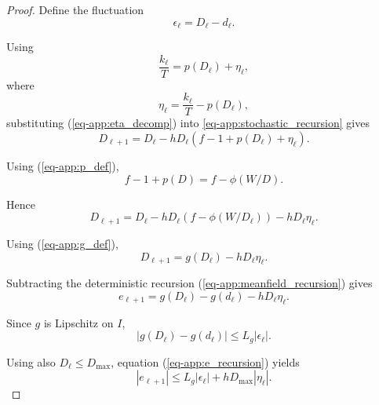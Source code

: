 \documentclass[10pt]{iopart}
\newcommand{\1}{\mathbf{1}}
\begin{document}
\begin{proof}

Define the fluctuation
\begin{equation}
\epsilon_\ell=D_\ell-d_\ell.
\label{eq-app:e_def}
\end{equation}

Using
\begin{equation}
\frac{k_\ell}{T}
=
p(D_\ell)+\eta_\ell,
\label{eq-app:eta_decomp}
\end{equation}
where
\begin{equation}
\eta_\ell
=
\frac{k_\ell}{T}-p(D_\ell),
\label{eq-app:eta_def}
\end{equation}
substituting (\ref{eq-app:eta_decomp}) into
\ref{eq-app:stochastic_recursion} gives
\begin{equation}
D_{\ell+1}
=
D_\ell
-
hD_\ell
\left(
f-1+p(D_\ell)+\eta_\ell
\right).
\label{eq-app:substituted}
\end{equation}

Using (\ref{eq-app:p_def}),
\begin{equation}
f-1+p(D)
=
f-\phi(W/D).
\label{eq-app:simplify_p}
\end{equation}

Hence
\begin{equation}
D_{\ell+1}
=
D_\ell
-
hD_\ell
\left(
f-\phi(W/D_\ell)
\right)
-
hD_\ell\eta_\ell.
\label{eq-app:stochastic_eta}
\end{equation}

Using (\ref{eq-app:g_def}),
\begin{equation}
D_{\ell+1}
=
g(D_\ell)-hD_\ell\eta_\ell.
\label{eq-app:g_eta}
\end{equation}

Subtracting the deterministic recursion
(\ref{eq-app:meanfield_recursion}) gives
\begin{equation}
e_{\ell+1}
=
g(D_\ell)-g(d_\ell)
-
hD_\ell\eta_\ell.
\label{eq-app:e_recursion}
\end{equation}

Since $g$ is Lipschitz on $I$,
\begin{equation}
|g(D_\ell)-g(d_\ell)|
\le
L_g|\epsilon_\ell|.
\label{eq-app:g_lipschitz}
\end{equation}

Using also $D_\ell\le D_{\max}$,
equation (\ref{eq-app:e_recursion}) yields
\begin{equation}
|e_{\ell+1}|
\le
L_g|\epsilon_\ell|
+
hD_{\max}|\eta_\ell|.
\label{eq-app:e_ineq}
\end{equation}


\end{proof}
\end{document}
